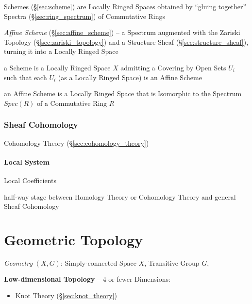 \fist Schemes (\S\ref{sec:scheme}) are Locally Ringed Spaces obtained by
``gluing together'' Spectra (\S\ref{sec:ring_spectrum}) of Commutative Rings

\fist \emph{Affine Scheme} (\S\ref{sec:affine_scheme}) -- a Spectrum augmented
with the Zariski Topology (\S\ref{sec:zariski_topology}) and a Structure Sheaf
(\S\ref{sec:structure_sheaf}), turning it into a Locally Ringed Space

a Scheme is a Locally Ringed Space $X$ admitting a Covering by Open Sets $U_i$
such that each $U_i$ (as a Locally Ringed Space) is an Affine Scheme

an Affine Scheme is a Locally Ringed Space that is Isomorphic to the Spectrum
$Spec(R)$ of a Commutative Ring $R$



\subsubsection{Sheaf Cohomology}\label{sec:sheaf_cohomology}

\fist Cohomology Theory (\S\ref{sec:cohomology_theory})



\paragraph{Local System}\label{sec:local_system}\hfill

Local Coefficients

half-way stage between Homology Theory or Cohomology Theory and general Sheaf
Cohomology



\section{Geometric Topology}\label{sec:geometric_topology}

\emph{Geometry} $(X,G)$: Simply-connected Space $X$, Transitive Group $G$,

\textbf{Low-dimensional Topology} -- $4$ or fewer Dimensions:
\begin{itemize}
  \item Knot Theory (\S\ref{sec:knot_theory})
\end{itemize}



